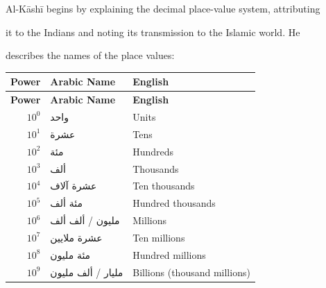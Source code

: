 \documentclass[11pt,a4paper]{article}
\newcommand{\ar}[1]{{\arabicfont\beginR #1\endR}}
\begin{document}
\vspace{0.3cm}



Al-K\=ash\=i begins by explaining the decimal place-value system, attributing

it to the Indians and noting its transmission to the Islamic world. He

describes the names of the place values:



\begin{longtable}{|r|l|l|}

\hline

\textbf{Power} & \textbf{Arabic Name} & \textbf{English} \\

\hline

\endfirsthead

\hline

\textbf{Power} & \textbf{Arabic Name} & \textbf{English} \\

\hline

\endhead

$10^0$ & \ar{واحد} & Units \\

\hline

$10^1$ & \ar{عشرة} & Tens \\

\hline

$10^2$ & \ar{مئة} & Hundreds \\

\hline

$10^3$ & \ar{ألف} & Thousands \\

\hline

$10^4$ & \ar{عشرة آلاف} & Ten thousands \\

\hline

$10^5$ & \ar{مئة ألف} & Hundred thousands \\

\hline

$10^6$ & \ar{مليون} / \ar{ألف ألف} & Millions \\

\hline

$10^7$ & \ar{عشرة ملايين} & Ten millions \\

\hline

$10^8$ & \ar{مئة مليون} & Hundred millions \\

\hline

$10^9$ & \ar{مليار} / \ar{ألف مليون} & Billions (thousand millions) \\

\hline

\end{longtable}
\end{document}
